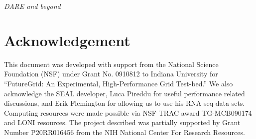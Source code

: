 \documentclass{sig-alternate}
\begin{document}
\textit{DARE and beyond}





\section*{Acknowledgement}
This document was developed with support from the National Science
Foundation (NSF) under Grant No.  0910812 to Indiana University for
``FutureGrid: An Experimental, High-Performance Grid Test-bed.''  We
also acknowledge the SEAL developer, Luca Pireddu for useful performance related
discussions, and Erik Flemington for allowing us to use his RNA-seq data sets. Computing resources were made possible via NSF TRAC award TG-MCB090174 and LONI resources.  The project described was partially
supported by Grant Number P20RR016456 from the NIH National Center For
Research Resources.

 

\end{document}
